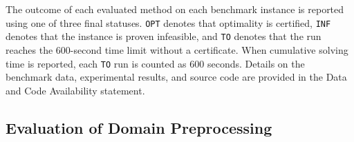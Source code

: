 \documentclass[letterpaper,journal]{IEEEtran}
\begin{document}
The outcome of each evaluated method on each benchmark instance is reported using one of three final statuses. \texttt{OPT} denotes that optimality is certified, \texttt{INF} denotes that the instance is proven infeasible, and \texttt{TO} denotes that the run reaches the 600-second time limit without a certificate. When cumulative solving time is reported, each \texttt{TO} run is counted as 600 seconds. Details on the benchmark data, experimental results, and source code are provided in the Data and Code Availability statement.

\subsection{Evaluation of Domain Preprocessing}
\end{document}
